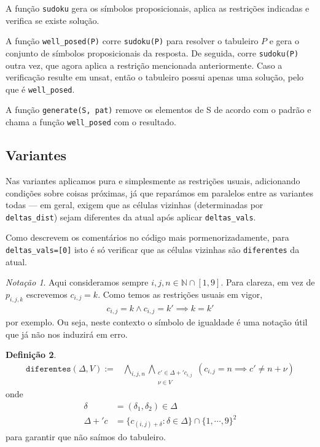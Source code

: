 \documentclass[a4paper,12pt]{article}
\theoremstyle{definition}
\newtheorem{defn}{Definição}[section]
\theoremstyle{theorem}
\theoremstyle{remark}
\newtheorem{notç}[defn]{Notação}
\newcommand{\code}[1]{\texttt{#1}}
\begin{document}
A função \code{sudoku} gera os símbolos proposicionais, aplica as restrições
indicadas e verifica se existe solução.

A função \code{well\_posed(P)} corre \code{sudoku(P)} para resolver o tabuleiro
$P$ e gera o conjunto de símbolos proposicionais da resposta. De seguida, corre
\code{sudoku(P)} outra vez, que agora aplica a restrição mencionada anteriormente.
Caso a verificação resulte em unsat, então o tabuleiro possui apenas uma solução,
pelo que é \code{well\_posed}.

A função \code{generate(S, pat)} remove os elementos de S de acordo com o
padrão e chama a função \code{well\_posed} com o resultado.

\subsection{Variantes}
Nas variantes aplicamos pura e simplesmente as restrições usuais,
adicionando condições sobre coisas próximas, já que reparámos em
paralelos entre as variantes todas \---- em geral, exigem que
as células vizinhas (determinadas por \code{deltas\_dist})
sejam diferentes da atual após aplicar \code{deltas\_vals}.

Como
descrevem os comentários no código mais pormenorizadamente, para
\code{deltas\_vals=[0]} isto é só verificar que as células vizinhas
são \code{diferentes} da atual.

\begin{notç}
   Aqui consideramos sempre $i,j,n\in\mathbb N\cap[1,9]$.
   Para clareza, em vez de $p_{i,j,k}$ escrevemos $c_{i,j}=k$. Como temos
   as restrições usuais em vigor,
   \begin{align}
      c_{i,j}=k\land c_{i,j}=k' \implies k = k'
   \end{align}
   por exemplo. Ou seja, neste contexto o símbolo de igualdade é uma notação
   útil que já não nos
   induzirá em erro.
\end{notç}

\begin{defn}
\begin{align}
   \mathtt{diferentes}(\Delta, V) :=%
   &\bigwedge_{i,j,n}
   \bigwedge_{\substack{c'\in\Delta+'c_{i,j}\\\nu\in V}}
   (c_{i,j} = n
      \implies
   c' \neq n + \nu)
\end{align}
onde
\begin{align}
   \delta &= (\delta_1,\delta_2)\in \Delta\\
   \Delta+'c &= \{c_{(i,j)+\delta}:\delta\in\Delta\}\cap\{1,\cdots,9\}^2
\end{align}
para garantir que não saímos do tabuleiro.
\end{defn}
\end{document}
